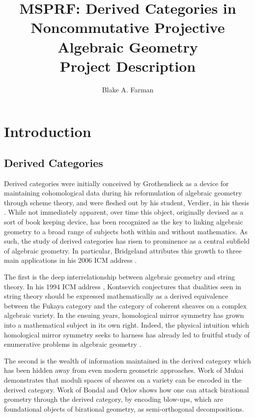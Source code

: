 \documentclass[11pt]{article}
\title{MSPRF: Derived Categories in Noncommutative Projective Algebraic Geometry\\\small{Project Description}}
\author{Blake A. Farman}
\date{}
\begin{document}
\maketitle

\section{Introduction}
\subsection{Derived Categories}
Derived categories were initially conceived by Grothendieck as a device for maintaining cohomological data during his reformulation of algebraic geometry through scheme theory, and were fleshed out by his student, Verdier, in his thesis \cite{Verdier}.
While not immediately apparent, over time this object, originally devised as a sort of book keeping device, has been recognized as the key to linking algebraic geometry to a broad range of subjects both within and without mathematics.
As such, the study of derived categories has risen to prominence as a central subfield of algebraic geometry.
In particular, Bridgeland attributes this growth to three main applications in his 2006 ICM address \cite{Bridgeland06}.

The first is the deep interrelationship between algebraic geometry and string theory.
In his 1994 ICM address \cite{Kontsevich}, Kontsevich conjectures that dualities seen in string theory should be expressed mathematically as a derived equivalence between the Fukaya category and the category of coherent sheaves on a complex algebraic variety.
In the ensuing years, homological mirror symmetry has grown into a mathematical subject in its own right.
Indeed, the physical intuition which homological mirror symmetry seeks to harness has already led to fruitful study of enumerative problems in algebraic geometry \cite{enumerative}.

The second is the wealth of information maintained in the derived category which has been hidden away from even modern geometric approaches.
Work of Mukai \cite{Mukai81,Mukai87} demonstrates that moduli spaces of sheaves on a variety can be encoded in the derived category.
Work of Bondal and Orlov \cite{Bondal-Orlov} shows how one can attack birational geometry through the derived category, by encoding blow-ups, which are foundational objects of birational geometry, as semi-orthogonal decompositions.
\end{document}

